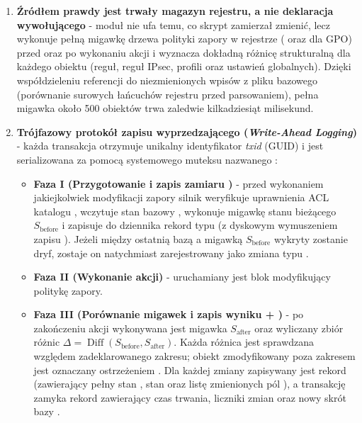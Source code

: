 \begin{enumerate}
    \item \textbf{Źródłem prawdy jest trwały magazyn rejestru, a nie deklaracja wywołującego} - moduł nie ufa temu, co skrypt zamierzał zmienić, lecz wykonuje pełną migawkę drzewa polityki zapory w rejestrze ( oraz  dla GPO) przed oraz po wykonaniu akcji i wyznacza dokładną różnicę strukturalną dla każdego obiektu (reguł, reguł IPsec, profili oraz ustawień globalnych). Dzięki współdzieleniu referencji do niezmienionych wpisów z pliku bazowego  (porównanie surowych łańcuchów rejestru przed parsowaniem), pełna migawka około 500 obiektów trwa zaledwie kilkadziesiąt milisekund.
    \item \textbf{Trójfazowy protokół zapisu wyprzedzającego (\textit{Write-Ahead Logging})} - każda transakcja otrzymuje unikalny identyfikator \textit{txid} (GUID) i jest serializowana za pomocą systemowego muteksu nazwanego :
    \begin{itemize}
        \item \textbf{Faza I (Przygotowanie i zapis zamiaru )} - przed wykonaniem jakiejkolwiek modyfikacji zapory silnik weryfikuje uprawnienia ACL katalogu , wczytuje stan bazowy , wykonuje migawkę stanu bieżącego $S_{\text{before}}$ i zapisuje do dziennika rekord typu  (z dyskowym wymuszeniem zapisu ). Jeżeli między ostatnią bazą  a migawką $S_{\text{before}}$ wykryty zostanie dryf, zostaje on natychmiast zarejestrowany jako zmiana typu .
        \item \textbf{Faza II (Wykonanie akcji)} - uruchamiany jest blok modyfikujący politykę zapory.
        \item \textbf{Faza III (Porównanie migawek i zapis wyniku  + )} - po zakończeniu akcji wykonywana jest migawka $S_{\text{after}}$ oraz wyliczany zbiór różnic $\Delta = \operatorname{Diff}(S_{\text{before}}, S_{\text{after}})$. Każda różnica jest sprawdzana względem zadeklarowanego zakresu; obiekt zmodyfikowany poza zakresem jest oznaczany ostrzeżeniem . Dla każdej zmiany zapisywany jest rekord  (zawierający pełny stan , stan  oraz listę zmienionych pól ), a transakcję zamyka rekord  zawierający czas trwania, liczniki zmian oraz nowy skrót bazy .
    \end{itemize}
\end{enumerate}

